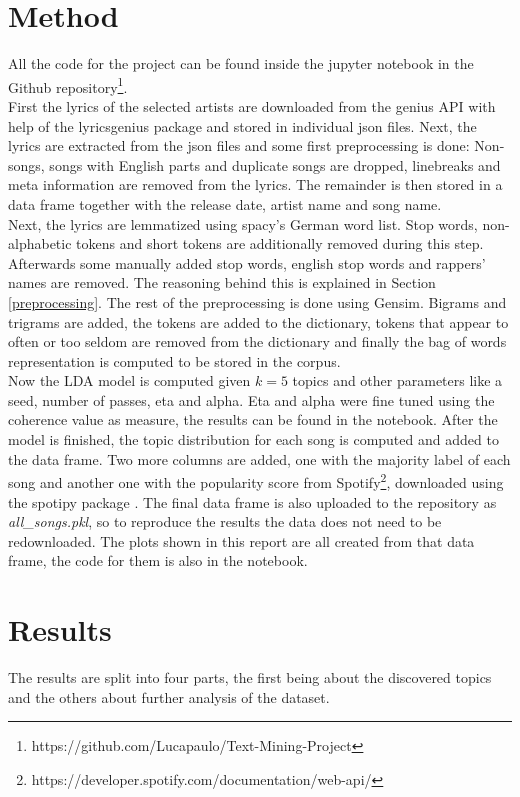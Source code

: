 \documentclass[conference]{IEEEtran}
\begin{document}
\section{Method}
All the code for the project can be found inside the jupyter notebook in the Github repository\footnote{https://github.com/Lucapaulo/Text-Mining-Project}.\\
First the lyrics of the selected artists are downloaded from the genius API with help of the lyricsgenius package \cite{lyricsgenius} and stored in individual json files. Next, the lyrics are extracted from the json files and some first preprocessing is done: Non-songs, songs with English parts and duplicate songs are dropped, linebreaks and meta information are removed from the lyrics. The remainder is then stored in a data frame together with the release date, artist name and song name.\\
Next, the lyrics are lemmatized using spacy's German word list. Stop words, non-alphabetic tokens and short tokens are additionally removed during this step. Afterwards some manually added stop words, english stop words and rappers' names are removed. The reasoning behind this is explained in Section \ref{preprocessing}. The rest of the preprocessing is done using Gensim. Bigrams and trigrams are added, the tokens are added to the dictionary, tokens that appear to often or too seldom are removed from the dictionary and finally the bag of words representation is computed to be stored in the corpus.\\
Now the LDA model is computed given $k=5$ topics and other parameters like a seed, number of passes, eta and alpha. Eta and alpha were fine tuned using the coherence value as measure, the results can be found in the notebook. After the model is finished, the topic distribution for each song is computed and added to the data frame. Two more columns are added, one with the majority label of each song and another one with the popularity score from Spotify\footnote{https://developer.spotify.com/documentation/web-api/}, downloaded using the spotipy package \cite{spotipy}. The final data frame is also uploaded to the repository as \textit{all\_songs.pkl}, so to reproduce the results the data does not need to be redownloaded. The plots shown in this report are all created from that data frame, the code for them is also in the notebook.

\section{Results} \label{results}
The results are split into four parts, the first being about the discovered topics and the others about further analysis of the dataset.
\end{document}
